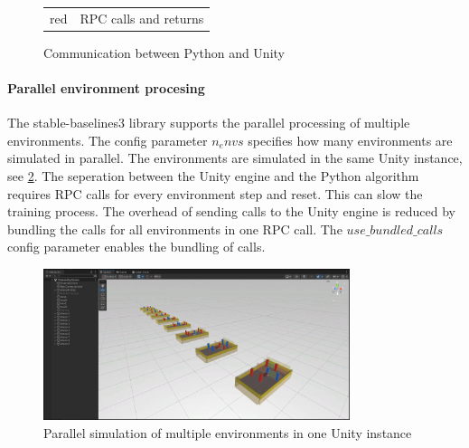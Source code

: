\begin{figure}[h]
    \begin{tabular}{r@{: }l}
        red & RPC calls and returns \\
    \end{tabular}
    \caption{Communication between Python and Unity}
    \label{fig:communication_python_unity}
\end{figure}


\paragraph{Parallel environment procesing}

The stable-baselines3 library supports the parallel processing of multiple environments. The config parameter $n_envs$ specifies how many environments are simulated in parallel. The environments are simulated in the same Unity instance, see \ref{fig:parallel_simulation_unity_instance}. The seperation between the Unity engine and the Python algorithm requires \ac{RPC} calls for every environment step and reset. This can slow the training process. The overhead of sending calls to the Unity engine is reduced by bundling the calls for all environments in one \ac{RPC} call. The $use\_bundled\_calls$ config parameter enables the bundling of calls.

\begin{figure}
    \centering
    \includegraphics[width=0.8\textwidth]{Bilder/parallel_simulation_unity_instance.png}
    \caption{Parallel simulation of multiple environments in one Unity instance}
    \label{fig:parallel_simulation_unity_instance}
\end{figure}


